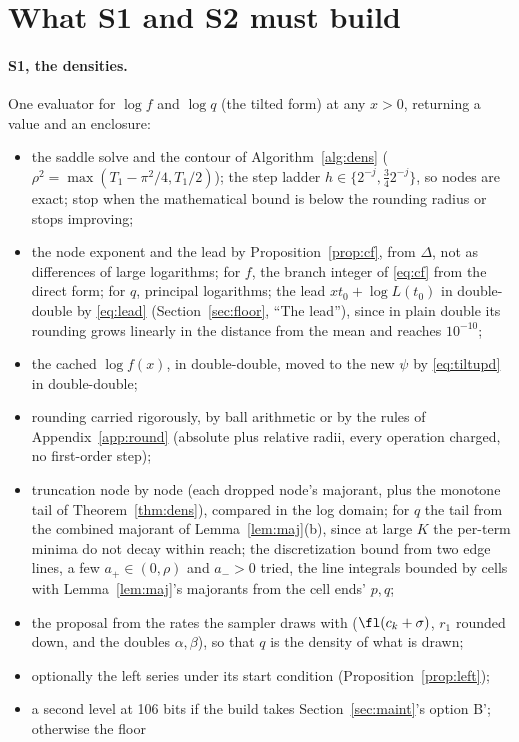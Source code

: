 \section{What S1 and S2 must build}\label{sec:build}

\paragraph{S1, the densities.} One evaluator for $\log f$ and $\log q$ (the tilted form) at any $x>0$, returning
a value and an enclosure:
\begin{itemize}
\item the saddle solve and the contour of Algorithm~\ref{alg:dens} ($\rho^2=\max(T_1-\pi^2/4,T_1/2)$); the step
ladder $h\in\{2^{-j},\frac342^{-j}\}$, so nodes are exact; stop when the mathematical bound is below the rounding
radius or stops improving;
\item the node exponent and the lead by Proposition~\ref{prop:cf}, from $\Delta$, not as differences of large
logarithms; for $f$, the branch integer of \eqref{eq:cf} from the direct form; for $q$, principal logarithms;
the lead $xt_0+\log L(t_0)$ in double-double by \eqref{eq:lead} (Section~\ref{sec:floor}, ``The lead''), since in
plain double its rounding grows linearly in the distance from the mean and reaches $10^{-10}$;
\item the cached $\log f(x)$, in double-double, moved to the new $\psi$ by \eqref{eq:tiltupd} in double-double;
\item rounding carried rigorously, by ball arithmetic or by the rules of Appendix~\ref{app:round} (absolute plus
relative radii, every operation charged, no first-order step);
\item truncation node by node (each dropped node's majorant, plus the monotone tail of Theorem~\ref{thm:dens}),
compared in the log domain; for $q$ the tail from the combined majorant of Lemma~\ref{lem:maj}(b), since at large
$K$ the per-term minima do not decay within reach; the discretization bound from two edge lines, a few $a_+\in(0,\rho)$ and $a_->0$
tried, the line integrals bounded by cells with Lemma~\ref{lem:maj}'s majorants from the cell ends' $p,q$;
\item the proposal from the rates the sampler draws with ($\fl(c_k+\sigma)$, $r_1$ rounded down, and the
doubles $\alpha,\beta$), so that $q$ is the density of what is drawn;
\item optionally the left series under its start condition (Proposition~\ref{prop:left});
\item a second level at 106 bits if the build takes Section~\ref{sec:maint}'s option B'; otherwise the floor

\end{itemize}
